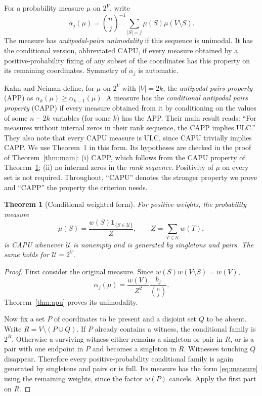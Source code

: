\documentclass[11pt,a4paper]{article}
\newtheorem{theorem}{Theorem}[section]
\theoremstyle{remark}
\newcommand{\U}{\mathcal U}
\newcommand{\ind}{\mathbf 1}
\begin{document}
For a probability measure $\mu$ on $2^V$, write
\[
\alpha_j(\mu)=\binom nj^{-1}\sum_{|S|=j}\mu(S)\mu(V\setminus S).
\]
The measure has \emph{antipodal-pairs unimodality} if this sequence is unimodal. It has the conditional version, abbreviated CAPU, if every measure obtained by a positive-probability fixing of any subset of the coordinates has this property on its remaining coordinates. Symmetry of $\alpha_j$ is automatic.

Kahn and Neiman define, for $\mu$ on $2^V$ with $|V|=2k$, the \emph{antipodal pairs property} (APP) as $\alpha_k(\mu)\ge\alpha_{k-1}(\mu)$. A measure has the \emph{conditional antipodal pairs property} (CAPP) if every measure obtained from it by conditioning on the values of some $n-2k$ variables (for some $k$) has the APP. Their main result \cite[Theorem 1]{KN} reads: ``For measures without internal zeros in their rank sequence, the CAPP implies ULC.'' They also note \cite[Corollary 12]{KN} that every CAPU measure is ULC, since CAPU trivially implies CAPP. We use Theorem~1 in this form. Its hypotheses are checked in the proof of Theorem~\ref{thm:main}: (i) CAPP, which follows from the CAPU property of Theorem~\ref{thm:capu}; (ii) no internal zeros in the \emph{rank sequence}. Positivity of $\mu$ on every set is not required. Throughout, ``CAPU'' denotes the stronger property we prove and ``CAPP'' the property the criterion needs.

\begin{theorem}[Conditional weighted form]\label{thm:capu}
For positive weights, the probability measure
\begin{equation}\label{eq:measure}
\mu(S)=\frac{w(S)\ind_{\{S\in\U\}}}{Z},\qquad
Z=\sum_{T\in\U}w(T),
\end{equation}
is CAPU whenever $\U$ is nonempty and is generated by singletons and pairs. The same holds for $\U=2^V$.
\end{theorem}
\begin{proof}
First consider the original measure. Since $w(S)w(V\setminus S)=w(V)$,
\[
\alpha_j(\mu)=\frac{w(V)}{Z^2}\frac{b_j}{\binom nj}.
\]
Theorem~\ref{thm:apu} proves its unimodality.

Now fix a set $P$ of coordinates to be present and a disjoint set $Q$ to be absent. Write $R=V\setminus(P\cup Q)$. If $P$ already contains a witness, the conditional family is $2^R$. Otherwise a surviving witness either remains a singleton or pair in $R$, or is a pair with one endpoint in $P$ and becomes a singleton in $R$. Witnesses touching $Q$ disappear. Therefore every positive-probability conditional family is again generated by singletons and pairs or is full. Its measure has the form \eqref{eq:measure} using the remaining weights, since the factor $w(P)$ cancels. Apply the first part on $R$.
\end{proof}
\end{document}
